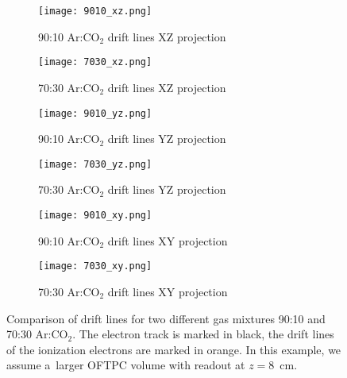 			\begin{figure}
				\centering
				\begin{subfigure}[t]{0.48\textwidth}
					\centering
					\texttt{[image: 9010\_xz.png]}
					\caption{90:10 Ar:CO$_2$ drift lines XZ projection}
				\end{subfigure}
				\hfill
				\begin{subfigure}[t]{0.48\textwidth}
					\centering
					\texttt{[image: 7030\_xz.png]}
					\caption{70:30 Ar:CO$_2$ drift lines XZ projection}
				\end{subfigure}
				\hfill
				\begin{subfigure}[t]{0.48\textwidth}
					\centering
					\texttt{[image: 9010\_yz.png]}
					\caption{90:10 Ar:CO$_2$ drift lines YZ projection}
				\end{subfigure}
				\hfill
				\begin{subfigure}[t]{0.48\textwidth}
					\centering
					\texttt{[image: 7030\_yz.png]}
					\caption{70:30 Ar:CO$_2$ drift lines YZ projection}
				\end{subfigure}
				\hfill
				\begin{subfigure}[t]{0.48\textwidth}
					\centering
					\texttt{[image: 9010\_xy.png]}
					\caption{90:10 Ar:CO$_2$ drift lines XY projection}
				\end{subfigure}
				\hfill
				\begin{subfigure}[t]{0.48\textwidth}
					\centering
					\texttt{[image: 7030\_xy.png]}
					\caption{70:30 Ar:CO$_2$ drift lines XY projection}
				\end{subfigure}
				\caption{Comparison of drift lines for two different gas mixtures 90:10 and 70:30 Ar:CO$_2$. The electron track is marked in black, the drift lines of the ionization electrons are marked in orange. In this example, we assume a~larger \ac{OFTPC} volume with readout at $z = 8$~cm.}
				\label{fig:microfirst}
			\end{figure}
			
